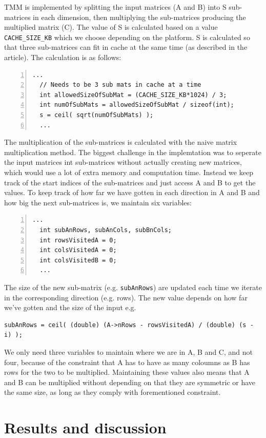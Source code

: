 TMM is implemented by splitting the input matrices (A and B) into S sub-matrices in each dimension, then multiplying the sub-matrices producing the multiplied matrix (C). 
The value of S is calculated based on a value \verb!CACHE_SIZE_KB! which we choose depending on the platform. S is calculated so that three sub-matrices can fit in cache at the same time (as described in the article).
The calculation is as follows:
\begin{lstlisting}[numbers=left]
  ...
  // Needs to be 3 sub mats in cache at a time
  int allowedSizeOfSubMat = (CACHE_SIZE_KB*1024) / 3;
  int numOfSubMats = allowedSizeOfSubMat / sizeof(int);
  s = ceil( sqrt(numOfSubMats) );
  ... 
\end{lstlisting}
The multiplication of the sub-matrices is calculated with the naive matrix multiplication method. 
The biggest challenge in the implemtation was to seperate the input matrices int sub-matrices without actually creating new matrices, which would use a lot of extra memory and computation time. 
Instead we keep track of the start indices of the sub-matrices and just access A and B to get the values. 
To keep track of how far we have gotten in each direction in A and B and how big the next sub-matrices is, we maintain six variables:
\begin{lstlisting}[numbers=left]
  ...
  int subAnRows, subAnCols, subBnCols;
  int rowsVisitedA = 0;
  int colsVisitedA = 0;
  int colsVisitedB = 0;
  ...
\end{lstlisting}
The size of the new sub-matrix (e.g. \verb!subAnRows!) are updated each time we iterate in the corresponding direction (e.g. rows). 
The new value depends on how far we've gotten and the size of the input e.g.
\begin{lstlisting}
subAnRows = ceil( (double) (A->nRows - rowsVisitedA) / (double) (s - i) );
\end{lstlisting}

We only need three variables to maintain where we are in A, B and C, and not four, because of the constraint that A has to have as many coloumns as B has rows for the two to be multiplied. 
Maintaining these values also means that A and B can be multiplied without depending on that they are symmetric or have the same size, as long as they comply with forementioned constraint.



\section{Results and discussion}


